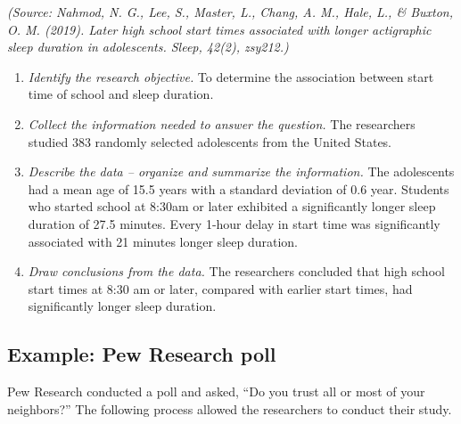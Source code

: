 \documentclass{ximera}
\begin{document}
\emph{(Source: Nahmod, N. G., Lee, S., Master, L., Chang, A. M., Hale, L., \& Buxton, O. M. (2019). Later high school start times associated with longer actigraphic sleep duration in adolescents. Sleep, 42(2), zsy212.)}

\begin{enumerate}
  \item \textit{Identify the research objective.} To determine the association between start time of school and sleep duration.
  \item \textit{Collect the information needed to answer the question.} The researchers studied 383 randomly selected adolescents from the United States.
  \item \textit{Describe the data -- organize and summarize the information.} The adolescents had a mean age of 15.5 years with a standard deviation of 0.6 year. Students who started school at 8:30am or later exhibited a significantly longer sleep duration of 27.5 minutes. Every 1-hour delay in start time was significantly associated with 21 minutes longer sleep duration.
  \item \textit{Draw conclusions from the data.} The researchers concluded that high school start times at 8:30 am or later, compared with earlier start times, had significantly longer sleep duration.
\end{enumerate}

\subsection*{Example: Pew Research poll}

Pew Research conducted a poll and asked, ``Do you trust all or most of your neighbors?'' The following process allowed the researchers to conduct their study.
\end{document}
